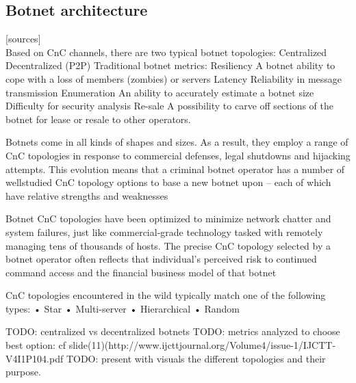 


\subsection{Botnet architecture}
[sources]\\


Based on CnC channels, there are two typical botnet topologies:
Centralized
Decentralized (P2P)
     Traditional botnet metrics:
Resiliency
A botnet ability to cope with a loss of members (zombies) or servers
Latency
Reliability in message transmission
Enumeration
An ability to accurately estimate a botnet size
Difficulty for security analysis
Re-sale
A possibility to carve off sections of the botnet for lease or resale to
other operators. 

Botnets come in all kinds of shapes and sizes. As a result, they employ a range of CnC
topologies in response to commercial defenses, legal shutdowns and hijacking
attempts. This evolution means that a criminal botnet operator has a number of wellstudied
CnC topology options to base a new botnet upon – each of which have
relative strengths and weaknesses

Botnet CnC topologies have been optimized to minimize network chatter and system
failures, just like commercial-grade technology tasked with remotely managing tens of
thousands of hosts. The precise CnC topology selected by a botnet operator often
reflects that individual’s perceived risk to continued command access and the financial
business model of that botnet

CnC topologies encountered in the wild typically match one of the following types:
• Star
• Multi-server
• Hierarchical
• Random

TODO: centralized vs decentralized botnets
TODO: metrics analyzed to choose best option: cf slide(11)(http://www.ijcttjournal.org/Volume4/issue-1/IJCTT-V4I1P104.pdf
TODO: present with visuals the different topologies and their purpose.

